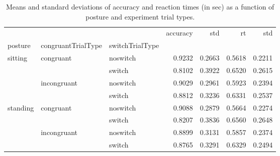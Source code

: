 \begin{table}
\centering
\caption{Means and standard deviations of accuracy and reaction times (in sec) as a function of posture and experiment trial types.}
\label{table-task-switching-replication-reaction-time}
\begin{tabular}{lllrrrr}
\toprule
         &             &        & accuracy &    std &     rt &    std \\
posture & congruantTrialType & switchTrialType &          &        &        &        \\
\midrule
sitting & congruant & noswitch &   0.9232 & 0.2663 & 0.5618 & 0.2211 \\
         &             & switch &   0.8102 & 0.3922 & 0.6520 & 0.2615 \\
         & incongruant & noswitch &   0.9029 & 0.2961 & 0.5923 & 0.2394 \\
         &             & switch &   0.8812 & 0.3236 & 0.6331 & 0.2537 \\
standing & congruant & noswitch &   0.9088 & 0.2879 & 0.5664 & 0.2274 \\
         &             & switch &   0.8207 & 0.3836 & 0.6560 & 0.2648 \\
         & incongruant & noswitch &   0.8899 & 0.3131 & 0.5857 & 0.2374 \\
         &             & switch &   0.8765 & 0.3291 & 0.6329 & 0.2494 \\
\bottomrule
\end{tabular}
\end{table}
